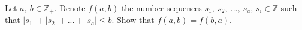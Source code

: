 Let $a, \ b \in \mathbb{Z_{+}}$. Denote $f(a, b)$ the number sequences $s_1, \ s_2, \ ..., \ s_a$, $s_i \in \mathbb{Z}$ such that $|s_1|+|s_2|+...+|s_a| \le b$. Show that $f(a, b)=f(b, a)$.